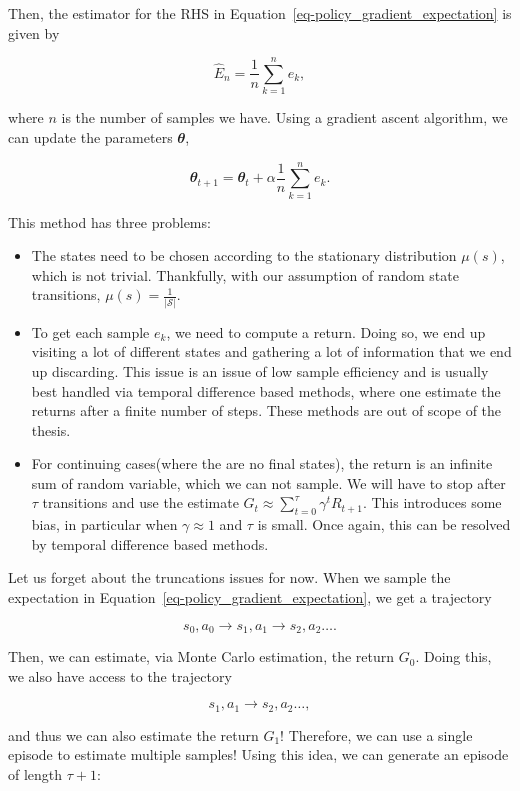 \documentclass[
  letterpaper,
]{report}
\providecommand{\tightlist}{%
  \setlength{\itemsep}{0pt}\setlength{\parskip}{0pt}}\usepackage{longtable,booktabs,array}
\theoremstyle{plain}
\theoremstyle{definition}
\theoremstyle{definition}
\theoremstyle{remark}
\begin{document}
Then, the estimator for the RHS in
Equation~\ref{eq-policy_gradient_expectation} is given by

\[
\hat{E}_n = \frac{1}{n}\sum_{k=1}^n e_k,
\]

where \(n\) is the number of samples we have. Using a gradient ascent
algorithm, we can update the parameters \(\mathbfit{\theta}\),

\[
\mathbfit{\theta}_{t+1} = \mathbfit{\theta}_t + \alpha\frac{1}{n}\sum_{k=1}^n e_k.
\]

This method has three problems:

\begin{itemize}
\tightlist
\item
  The states need to be chosen according to the stationary distribution
  \(\mu(s)\), which is not trivial. Thankfully, with our assumption of
  random state transitions, \(\mu(s) = \frac{1}{|\mathcal{S}|}\).
\item
  To get each sample \(e_k\), we need to compute a return. Doing so, we
  end up visiting a lot of different states and gathering a lot of
  information that we end up discarding. This issue is an issue of low
  sample efficiency and is usually best handled via temporal difference
  based methods, where one estimate the returns after a finite number of
  steps. These methods are out of scope of the thesis.
\item
  For continuing cases(where the are no final states), the return is an
  infinite sum of random variable, which we can not sample. We will have
  to stop after \(\tau\) transitions and use the estimate
  \(G_t \approx \sum_{t=0}^\tau \gamma^t R_{t+1}\). This introduces some
  bias, in particular when \(\gamma \approx 1\) and \(\tau\) is small.
  Once again, this can be resolved by temporal difference based methods.
\end{itemize}

Let us forget about the truncations issues for now. When we sample the
expectation in Equation~\ref{eq-policy_gradient_expectation}, we get a
trajectory

\[
s_0,a_0 \to s_{1}, a_{1} \to s_{2},a_{2} \dots .
\]

Then, we can estimate, via Monte Carlo estimation, the return \(G_0\).
Doing this, we also have access to the trajectory

\[
s_{1}, a_{1} \to s_{2},a_{2} \dots,
\]

and thus we can also estimate the return \(G_{1}\)! Therefore, we can
use a single episode to estimate multiple samples! Using this idea, we
can generate an episode of length \(\tau +1\):
\end{document}
